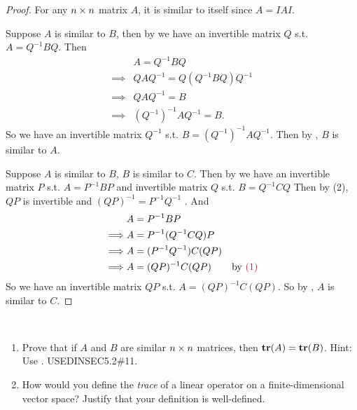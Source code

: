 \begin{proof}
For any \(n \times n\) matrix \(A\), it is similar to itself since \(A = IAI\).

Suppose \(A\) is similar to \(B\), then by  we have an invertible matrix \(Q\) s.t. \(A = Q^{-1}BQ\).
Then
\begin{align*}
             & A = Q^{-1}BQ \\
    \implies & Q A Q^{-1} = Q (Q^{-1} B Q) Q^{-1} \\
    \implies & Q A Q^{-1} = B \\
    \implies & (Q^{-1})^{-1} A Q^{-1} = B.
\end{align*}
So we have an invertible matrix \(Q^{-1}\) s.t. \(B = (Q^{-1})^{-1} A Q^{-1}\).
Then by , \(B\) is similar to \(A\).

Suppose \(A\) is similar to \(B\), \(B\) is similar to \(C\).
Then by  we have an invertible matrix \(P\) s.t. \(A = P^{-1}BP\) and invertible matrix \(Q\) s.t. \(B = Q^{-1}CQ\)
Then by (2), \(QP\) is invertible and \((QP)^{-1} = P^{-1} Q^{-1}\) .
And
\begin{align*}
             & A = P^{-1}BP \\
    \implies & A = P^{-1} (Q^{-1} C Q) P \\
    \implies & A = (P^{-1} Q^{-1}) C (Q P) \\
    \implies & A = (Q P)^{-1} C (Q P) & \text{by \MAROON{(1)}}
\end{align*}
So we have an invertible matrix \(QP\) s.t. \(A = (QP)^{-1} C (QP)\).
So by , \(A\) is similar to \(C\).
\end{proof}

\begin{exercise} \label{exercise 2.5.10} \ 

\begin{enumerate}
\item Prove that if \(A\) and \(B\) are similar \(n \times n\) matrices, then \(\textbf{tr}(A) = \textbf{tr}(B)\).
Hint: Use .
USEDINSEC5.2\#11.

\item How would you define the \emph{trace} of a linear operator on a finite-dimensional vector space?
Justify that your definition is well-defined.
\end{enumerate}
\end{exercise}

